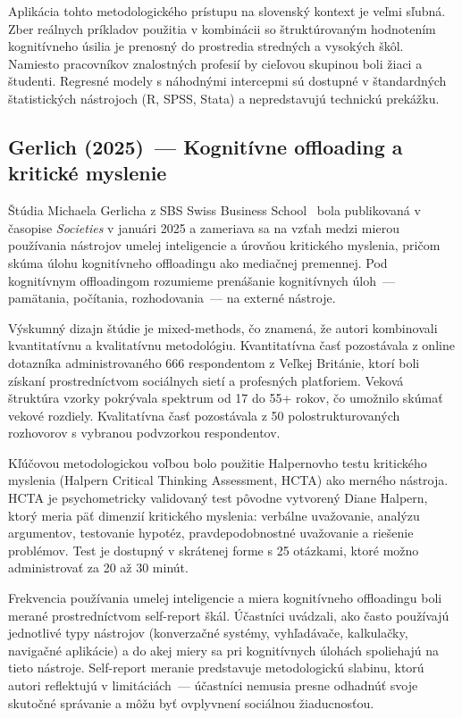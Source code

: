 Aplikácia tohto metodologického prístupu na slovenský kontext je veľmi sľubná. Zber reálnych príkladov použitia v kombinácii so štruktúrovaným hodnotením kognitívneho úsilia je prenosný do prostredia stredných a vysokých škôl. Namiesto pracovníkov znalostných profesií by cieľovou skupinou boli žiaci a študenti. Regresné modely s náhodnými intercepmi sú dostupné v štandardných štatistických nástrojoch (R, SPSS, Stata) a nepredstavujú technickú prekážku.


\subsection{Gerlich (2025)~--- Kognitívne offloading a kritické myslenie}

Štúdia Michaela Gerlicha z SBS Swiss Business School~\cite{gerlich2025offloading} bola publikovaná v časopise \textit{Societies} v januári 2025 a zameriava sa na vzťah medzi mierou používania nástrojov umelej inteligencie a úrovňou kritického myslenia, pričom skúma úlohu kognitívneho offloadingu ako mediačnej premennej. Pod kognitívnym offloadingom rozumieme prenášanie kognitívnych úloh~--- pamätania, počítania, rozhodovania~--- na externé nástroje.

Výskumný dizajn štúdie je mixed-methods, čo znamená, že autori kombinovali kvantitatívnu a kvalitatívnu metodológiu. Kvantitatívna časť pozostávala z online dotazníka administrovaného 666 respondentom z Veľkej Británie, ktorí boli získaní prostredníctvom sociálnych sietí a profesných platforiem. Veková štruktúra vzorky pokrývala spektrum od 17 do 55+ rokov, čo umožnilo skúmať vekové rozdiely. Kvalitatívna časť pozostávala z 50 polostrukturovaných rozhovorov s vybranou podvzorkou respondentov.

Kľúčovou metodologickou voľbou bolo použitie Halpernovho testu kritického myslenia (Halpern Critical Thinking Assessment, HCTA) ako merného nástroja. HCTA je psychometricky validovaný test pôvodne vytvorený Diane Halpern, ktorý meria päť dimenzií kritického myslenia: verbálne uvažovanie, analýzu argumentov, testovanie hypotéz, pravdepodobnostné uvažovanie a riešenie problémov. Test je dostupný v skrátenej forme s 25 otázkami, ktoré možno administrovať za 20 až 30 minút.

Frekvencia používania umelej inteligencie a miera kognitívneho offloadingu boli merané prostredníctvom self-report škál. Účastníci uvádzali, ako často používajú jednotlivé typy nástrojov (konverzačné systémy, vyhľadávače, kalkulačky, navigačné aplikácie) a do akej miery sa pri kognitívnych úlohách spoliehajú na tieto nástroje. Self-report meranie predstavuje metodologickú slabinu, ktorú autori reflektujú v limitáciách~--- účastníci nemusia presne odhadnúť svoje skutočné správanie a môžu byť ovplyvnení sociálnou žiaducnosťou.

